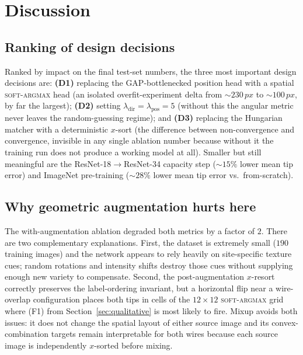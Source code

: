 \documentclass[conference,10pt,letterpaper]{IEEEtran}
\newcommand{\rnt}{ResNet-34}
\newcommand{\rne}{ResNet-18}
\newcommand{\softargmax}{\textsc{soft-argmax}}
\newcommand{\px}{\,px}
\begin{document}
\section{Discussion}
\label{sec:discussion}

\subsection{Ranking of design decisions}
Ranked by impact on the final test-set numbers, the three most important
design decisions are: \textbf{(D1)} replacing the GAP-bottlenecked
position head with a spatial \softargmax{} head (an isolated
overfit-experiment delta from $\sim 230\px$ to $\sim 100\px$, by far the
largest); \textbf{(D2)} setting
$\lambda_\text{dir}=\lambda_\text{pos}=5$ (without this the angular
metric never leaves the random-guessing regime); and \textbf{(D3)}
replacing the Hungarian matcher with a deterministic $x$-sort (the
difference between non-convergence and convergence, invisible in any
single ablation number because without it the training run does not
produce a working model at all). Smaller but still meaningful are the
\rne{}$\to$\rnt{} capacity step ($\sim 15\%$ lower mean tip error) and
ImageNet pre-training ($\sim 28\%$ lower mean tip error vs.\
from-scratch).

\subsection{Why geometric augmentation hurts here}
The with-augmentation ablation degraded both metrics by a factor of $2$.
There are two complementary explanations. First, the dataset is
extremely small ($190$ training images) and the network appears to rely
heavily on site-specific texture cues; random rotations and intensity
shifts destroy those cues without supplying enough new variety to
compensate. Second, the post-augmentation $x$-resort correctly preserves
the label-ordering invariant, but a horizontal flip near a wire-overlap
configuration places both tips in cells of the $12{\times}12$
\softargmax{} grid where (F1) from
Section~\ref{sec:qualitative} is most likely to fire. Mixup avoids both
issues: it does not change the spatial layout of either source image and
its convex-combination targets remain interpretable for both wires
because each source image is independently $x$-sorted before mixing.
\end{document}
